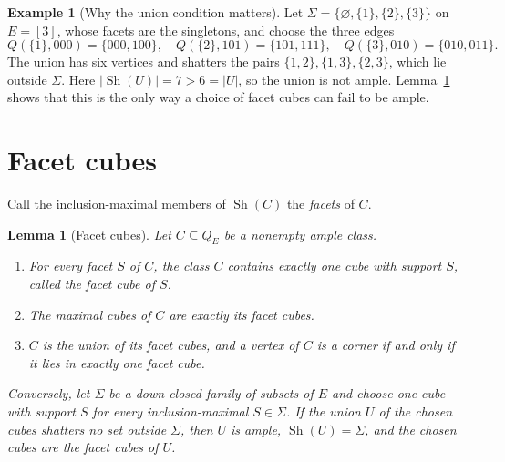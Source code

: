 \documentclass[11pt]{article}
\numberwithin{equation}{section}
\newtheorem{lemma}[theorem]{Lemma}
\theoremstyle{definition}
\newtheorem{example}[theorem]{Example}
\theoremstyle{remark}
\newcommand{\Sh}{\operatorname{Sh}}
\begin{document}
\begin{example}[Why the union condition matters]
\label{ex:non-ample-union}
Let \(\Sigma=\{\varnothing,\{1\},\{2\},\{3\}\}\) on \(E=[3]\), whose facets
are the singletons, and choose the three edges
\[
 Q(\{1\},000)=\{000,100\},\quad Q(\{2\},101)=\{101,111\},\quad
 Q(\{3\},010)=\{010,011\}.
\]
The union has six vertices and shatters the pairs \(\{1,2\},\{1,3\},
\{2,3\}\), which lie outside \(\Sigma\).  Here \(|\Sh(U)|=7>6=|U|\), so the
union is not ample.  Lemma~\ref{lem:facet-cubes} shows that this is the
only way a choice of facet cubes can fail to be ample.
\end{example}

\section{Facet cubes}
\label{sec:facet}

Call the inclusion-maximal members of \(\Sh(C)\) the \emph{facets} of
\(C\).

\begin{lemma}[Facet cubes]
\label{lem:facet-cubes}
Let \(C\subseteq Q_E\) be a nonempty ample class.
\begin{enumerate}
\item For every facet \(S\) of \(C\), the class \(C\) contains exactly one
      cube with support \(S\), called the \emph{facet cube} of \(S\).
\item The maximal cubes of \(C\) are exactly its facet cubes.
\item \(C\) is the union of its facet cubes, and a vertex of \(C\) is a
      corner if and only if it lies in exactly one facet cube.
\end{enumerate}
Conversely, let \(\Sigma\) be a down-closed family of subsets of \(E\)
and choose one cube with support \(S\) for every inclusion-maximal
\(S\in\Sigma\).  If the union \(U\) of the chosen cubes shatters no set
outside \(\Sigma\), then \(U\) is ample, \(\Sh(U)=\Sigma\), and the chosen
cubes are the facet cubes of \(U\).
\end{lemma}
\end{document}
